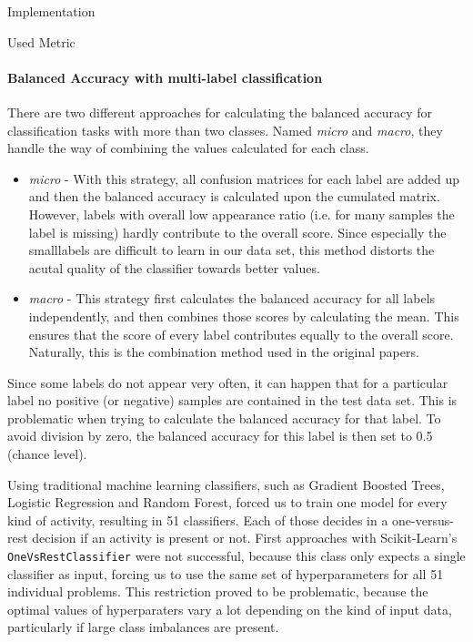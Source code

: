 \begin{section}{Implementation}
\begin{subsection}{Used Metric}
		\paragraph{Balanced Accuracy with multi-label classification}
		There are two different approaches for calculating the balanced accuracy for classification tasks with more than two classes. Named \emph{micro} and \emph{macro}, they handle the way of combining the values calculated for each class.
		\begin{itemize}
			\item \emph{micro} - With this strategy, all confusion matrices for each label are added up and then the balanced accuracy is calculated upon the cumulated matrix. However, labels with overall low appearance ratio (i.e. for many samples the label is missing) hardly contribute to the overall score. Since especially the \glqq small\grqq labels are difficult to learn in our data set, this method distorts the acutal quality of the classifier towards better values.
			\item \emph{macro} - This strategy first calculates the balanced accuracy for all labels independently, and then combines those scores by calculating the mean. This ensures that the score of every label contributes equally to the overall score. Naturally, this is the combination method used in the original papers.
		\end{itemize}
		Since some labels do not appear very often, it can happen that for a particular label no positive (or negative) samples are contained in the test data set. This is problematic when trying to calculate the balanced accuracy for that label. To avoid division by zero, the balanced accuracy for this label is then set to 0.5 (chance level).
	\end{subsection}


Using traditional machine learning classifiers, such as Gradient Boosted Trees, Logistic Regression and Random Forest, forced us to train one model for every kind of activity, resulting in 51 classifiers. Each of those decides in a one-versus-rest decision if an activity is present or not. 
First approaches with Scikit-Learn's \texttt{OneVsRestClassifier} were not successful, because this class only expects a single classifier as input, forcing us to use the same set of hyperparameters for all 51 individual problems. This restriction proved to be problematic, because the optimal values of hyperparaters vary a lot depending on the kind of input data, particularly if large class imbalances are present.


\end{section}

